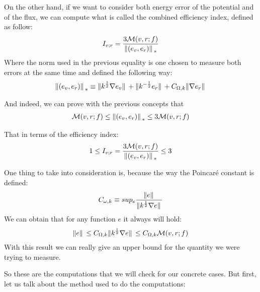 \documentclass{article}
\begin{document}
    On the other hand, if we want to consider both energy error of the potential and of the flux, we can compute what is called the combined efficiency index, defined as follow:
    \begin{align*}
        I_{v;r} = \frac{3\mathcal{M}(v,r;f)}{\norm*{(e_v, e_r)}_*}
    \end{align*}
    Where the norm used in the previous equality is one chosen to measure both errors at the same time and defined the following way:
    \begin{align*}
        \norm*{(e_v,e_r)}_{*} \equiv \norm*{k^{\frac{1}{2}}\nabla e_v} + \norm*{k^{-\frac{1}{2}}e_r} + C_{\Omega,k}\norm*{\nabla e_r}
    \end{align*}
    
    And indeed, we can prove with the previous concepts that 
    \begin{align*}
        \mathcal{M}(v,r;f) \leq  \norm*{(e_v,e_r)}_{*}  \leq 3\mathcal{M}(v,r;f)
    \end{align*}

    That in terms of the efficiency index:
    \begin{align*}
        1 \leq I_{v;r} = \frac{3\mathcal{M}(v,r;f)}{\norm*{(e_v, e_r)}_*} \leq 3
    \end{align*}

    One thing to take into consideration is, because the way the Poincaré constant is defined:
    \begin{align*}
        C_{\omega,k} \equiv sup_e \frac{\norm*{e}}{\norm*{k^{\frac{1}{2}}\nabla{e}}}
    \end{align*}
    We can obtain that for any function $e$ it always will hold:
    \begin{align*}
        \norm*{e} \leq C_{\Omega,k}\norm*{k^{\frac{1}{2}}\nabla{e}} \leq C_{\Omega,k}\mathcal{M}(v,r;f)
    \end{align*}
    With this result we can really give an upper bound for the quantity we were trying to measure.

    So these are the computations that we will check for our concrete cases. But first, let us talk about the method used to do the computations:
\end{document}
